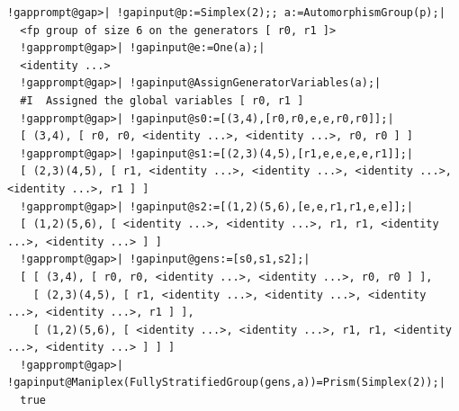 \documentclass[a4paper,11pt]{report}
\begin{document}
{{ 
\begin{Verbatim}[commandchars=!@|,fontsize=\small,frame=single,label=Example]
  !gapprompt@gap>| !gapinput@p:=Simplex(2);; a:=AutomorphismGroup(p);|
  <fp group of size 6 on the generators [ r0, r1 ]>
  !gapprompt@gap>| !gapinput@e:=One(a);|
  <identity ...>
  !gapprompt@gap>| !gapinput@AssignGeneratorVariables(a);|
  #I  Assigned the global variables [ r0, r1 ]
  !gapprompt@gap>| !gapinput@s0:=[(3,4),[r0,r0,e,e,r0,r0]];|
  [ (3,4), [ r0, r0, <identity ...>, <identity ...>, r0, r0 ] ]
  !gapprompt@gap>| !gapinput@s1:=[(2,3)(4,5),[r1,e,e,e,e,r1]];|
  [ (2,3)(4,5), [ r1, <identity ...>, <identity ...>, <identity ...>, <identity ...>, r1 ] ]
  !gapprompt@gap>| !gapinput@s2:=[(1,2)(5,6),[e,e,r1,r1,e,e]];|
  [ (1,2)(5,6), [ <identity ...>, <identity ...>, r1, r1, <identity ...>, <identity ...> ] ]
  !gapprompt@gap>| !gapinput@gens:=[s0,s1,s2];|
  [ [ (3,4), [ r0, r0, <identity ...>, <identity ...>, r0, r0 ] ], 
    [ (2,3)(4,5), [ r1, <identity ...>, <identity ...>, <identity ...>, <identity ...>, r1 ] ], 
    [ (1,2)(5,6), [ <identity ...>, <identity ...>, r1, r1, <identity ...>, <identity ...> ] ] ]
  !gapprompt@gap>| !gapinput@Maniplex(FullyStratifiedGroup(gens,a))=Prism(Simplex(2));|
  true
\end{Verbatim}
 }

 }

   
\end{document}
